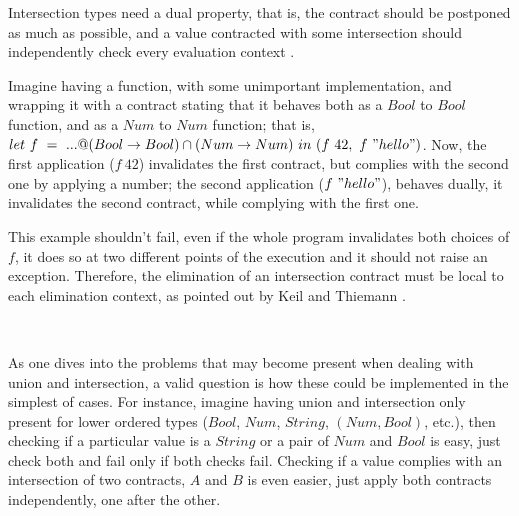 Intersection types need a dual property, that is, the contract
should be postponed as much as possible, and a value contracted with some intersection
should independently check every evaluation context 
.

Imagine having a function, with some unimportant implementation,
and wrapping it
with a contract stating that it behaves both as a $Bool$ to $Bool$ function,
and as a $Num$ to $Num$ function; that is, 
$let~f~=~...@(Bool \rightarrow Bool) \cap (Num \rightarrow Num)~in~(f~42,~f~"hello")$.
Now, the first application ($f~42$) invalidates the first contract, but complies with the second
one by applying a number; the second application ($f~"hello"$), behaves dually,
it invalidates the second contract,
while complying with the first one.

This example shouldn't fail, even if the whole program invalidates both choices of $f$, it does
so at two different points of the execution and it should not raise an exception.
Therefore, the elimination of an intersection contract must be local to each elimination
context, as pointed out by Keil and Thiemann \cite{KeilThiemannUnionIntersection}.

\\


As one dives into the problems that may become present when dealing with union and intersection,
a valid question is how these could be implemented in the simplest of cases.
For instance, imagine having
union and intersection only present for lower ordered types 
($Bool$, $Num$, $String$, $(Num, Bool)$, etc.), then checking
if a particular value is a $String$ or a pair of $Num$ and $Bool$ is easy,
just check both and fail only if both checks fail.
Checking if a value complies with an intersection of two contracts, $A$ and $B$ is even
easier, just apply both contracts independently, one after the other.

